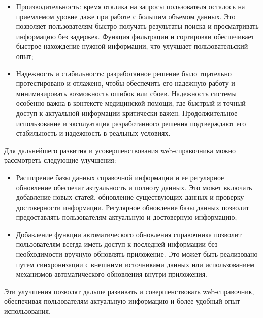 \begin{itemize}
    \item Производительность: время отклика на запросы пользователя осталось на приемлемом уровне даже при работе с большим объемом данных. Это позволяет пользователям быстро получать результаты поиска и просматривать информацию без задержек. Функция фильтрации и сортировки обеспечивает быстрое нахождение нужной информации, что улучшает пользовательский опыт;
    \item Надежность и стабильность: разработанное решение было тщательно протестировано и отлажено, чтобы обеспечить его надежную работу и минимизировать возможность ошибок или сбоев. Надежность системы особенно важна в контексте медицинской помощи, где быстрый и точный доступ к актуальной информации критически важен. Продолжительное использование и эксплуатация разработанного решения подтверждают его стабильность и надежность в реальных условиях.
\end{itemize}

Для дальнейшего развития и усовершенствования web-справочника можно рассмотреть следующие улучшения:

\begin{itemize}
    \item Расширение базы данных справочной информации и ее регулярное обновление обеспечат актуальность и полноту данных. Это может включать добавление новых статей, обновление существующих данных и проверку достоверности информации. Регулярное обновление базы данных позволит предоставлять пользователям актуальную и достоверную информацию;
    \item Добавление функции автоматического обновления справочника позволит пользователям всегда иметь доступ к последней информации без необходимости вручную обновлять приложение. Это может быть реализовано путем синхронизации с внешними источниками данных или использованием механизмов автоматического обновления внутри приложения.
\end{itemize}

Эти улучшения позволят дальше развивать и совершенствовать web-справочник, обеспечивая пользователям актуальную информацию и более удобный опыт использования.